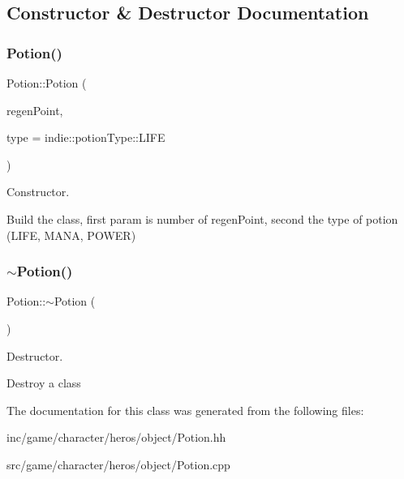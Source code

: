 \subsection{Constructor \& Destructor Documentation}
\mbox{\label{classPotion_a54db73677923273e469abf581ce0515c}} 
\subsubsection{\texorpdfstring{Potion()}{Potion()}}
{\footnotesize\ttfamily Potion\+::\+Potion (\begin{DoxyParamCaption}\item[{irr\+::s32}]{regen\+Point,  }\item[{indie\+::potion\+Type}]{type = {\ttfamily indie\+:\+:potionType\+:\+:LIFE} }\end{DoxyParamCaption})}



Constructor. 

Build the class, first param is number of regen\+Point, second the type of potion (L\+I\+FE, M\+A\+NA, P\+O\+W\+ER) \mbox{\label{classPotion_a8730c8052ec698171885bb5dacda9cca}} 
\subsubsection{\texorpdfstring{$\sim$\+Potion()}{~Potion()}}
{\footnotesize\ttfamily Potion\+::$\sim$\+Potion (\begin{DoxyParamCaption}{ }\end{DoxyParamCaption})}



Destructor. 

Destroy a class 

The documentation for this class was generated from the following files\+:\begin{DoxyCompactItemize}
\item 
inc/game/character/heros/object/Potion.\+hh\item 
src/game/character/heros/object/Potion.\+cpp\end{DoxyCompactItemize}
